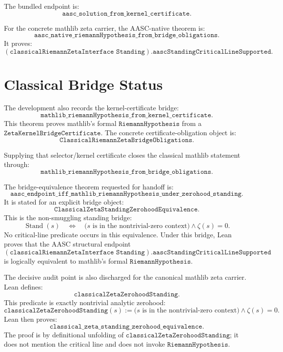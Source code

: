 \documentclass[11pt]{article}
\newcommand{\Stand}{\operatorname{Stand}}
\begin{document}
The bundled endpoint is:
\[
\texttt{aasc\_solution\_from\_kernel\_certificate}.
\]

For the concrete mathlib zeta carrier, the AASC-native theorem is:
\[
\texttt{aasc\_native\_riemannHypothesis\_from\_bridge\_obligations}.
\]
It proves:
\[
  (\texttt{classicalRiemannZetaInterface Standing})
  .\texttt{aascStandingCriticalLineSupported}.
\]

\section{Classical Bridge Status}

The development also records the kernel-certificate bridge:
\[
\texttt{mathlib\_riemannHypothesis\_from\_kernel\_certificate}.
\]
This theorem proves mathlib's formal \(\texttt{RiemannHypothesis}\) from a
\(\texttt{ZetaKernelBridgeCertificate}\).  The concrete certificate-obligation
object is:
\[
\texttt{ClassicalRiemannZetaBridgeObligations}.
\]

Supplying that selector/kernel certificate closes the classical mathlib
statement through:
\[
\texttt{mathlib\_riemannHypothesis\_from\_bridge\_obligations}.
\]

The bridge-equivalence theorem requested for handoff is:
\[
\texttt{aasc\_endpoint\_iff\_mathlib\_riemannHypothesis\_under\_zerohood\_standing}.
\]
It is stated for an explicit bridge object:
\[
\texttt{ClassicalZetaStandingZerohoodEquivalence}.
\]
This is the non-smuggling standing bridge:
\[
  \Stand(s)
  \quad\Longleftrightarrow\quad
  \bigl(s \text{ is in the nontrivial-zero context}\bigr)
  \wedge \zeta(s)=0.
\]
No critical-line predicate occurs in this equivalence.  Under this bridge,
Lean proves that the AASC structural endpoint
\[
  (\texttt{classicalRiemannZetaInterface Standing})
  .\texttt{aascStandingCriticalLineSupported}
\]
is logically equivalent to mathlib's formal \(\texttt{RiemannHypothesis}\).

The decisive audit point is also discharged for the canonical mathlib zeta
carrier.  Lean defines:
\[
\texttt{classicalZetaZerohoodStanding}.
\]
This predicate is exactly nontrivial analytic zerohood:
\[
  \texttt{classicalZetaZerohoodStanding}(s)
  :=
  \bigl(s \text{ is in the nontrivial-zero context}\bigr)
  \wedge \zeta(s)=0.
\]
Lean then proves:
\[
\texttt{classical\_zeta\_standing\_zerohood\_equivalence}.
\]
The proof is by definitional unfolding of
\(\texttt{classicalZetaZerohoodStanding}\); it does not mention the critical
line and does not invoke \(\texttt{RiemannHypothesis}\).
\end{document}
